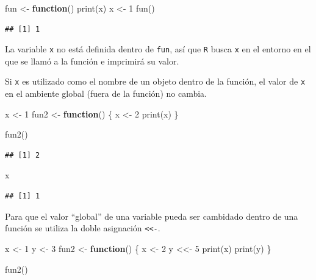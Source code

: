 \documentclass[
]{book}
\newenvironment{Shaded}{\begin{snugshade}}{\end{snugshade}}
\newcommand{\ControlFlowTok}[1]{\textcolor[rgb]{0.13,0.29,0.53}{\textbf{#1}}}
\newcommand{\DecValTok}[1]{\textcolor[rgb]{0.00,0.00,0.81}{#1}}
\newcommand{\FunctionTok}[1]{\textcolor[rgb]{0.00,0.00,0.00}{#1}}
\newcommand{\NormalTok}[1]{#1}
\newcommand{\OtherTok}[1]{\textcolor[rgb]{0.56,0.35,0.01}{#1}}
\theoremstyle{break}
\theoremstyle{nonumberplain}
\begin{document}
\begin{Shaded}
\begin{Highlighting}[]
\NormalTok{fun }\OtherTok{\textless{}{-}} \ControlFlowTok{function}\NormalTok{() }\FunctionTok{print}\NormalTok{(x)}
\NormalTok{x }\OtherTok{\textless{}{-}} \DecValTok{1}
\FunctionTok{fun}\NormalTok{()}
\end{Highlighting}
\end{Shaded}

\begin{verbatim}
## [1] 1
\end{verbatim}

La variable \texttt{x} no está definida dentro de \texttt{fun}, así que \texttt{R} busca
\texttt{x} en el entorno en el que se llamó a la función e imprimirá su valor.

Si \texttt{x} es utilizado como el nombre de un objeto dentro de la
función, el valor de \texttt{x} en el ambiente global (fuera de la función) no
cambia.

\begin{Shaded}
\begin{Highlighting}[]
\NormalTok{x }\OtherTok{\textless{}{-}} \DecValTok{1}
\NormalTok{fun2 }\OtherTok{\textless{}{-}} \ControlFlowTok{function}\NormalTok{() \{}
\NormalTok{    x }\OtherTok{\textless{}{-}} \DecValTok{2}
    \FunctionTok{print}\NormalTok{(x)}
\NormalTok{\}}

\FunctionTok{fun2}\NormalTok{()}
\end{Highlighting}
\end{Shaded}

\begin{verbatim}
## [1] 2
\end{verbatim}

\begin{Shaded}
\begin{Highlighting}[]
\NormalTok{x}
\end{Highlighting}
\end{Shaded}

\begin{verbatim}
## [1] 1
\end{verbatim}

Para que el valor ``global'' de una variable pueda ser cambidado dentro de
una función se utiliza la doble asignación \texttt{\textless{}\textless{}-}.

\begin{Shaded}
\begin{Highlighting}[]
\NormalTok{x }\OtherTok{\textless{}{-}} \DecValTok{1}
\NormalTok{y }\OtherTok{\textless{}{-}} \DecValTok{3}
\NormalTok{fun2 }\OtherTok{\textless{}{-}} \ControlFlowTok{function}\NormalTok{() \{}
\NormalTok{    x }\OtherTok{\textless{}{-}} \DecValTok{2}
\NormalTok{    y }\OtherTok{\textless{}\textless{}{-}} \DecValTok{5}
    \FunctionTok{print}\NormalTok{(x)}
    \FunctionTok{print}\NormalTok{(y)}
\NormalTok{\}}

\FunctionTok{fun2}\NormalTok{()}
\end{Highlighting}
\end{Shaded}
\end{document}
